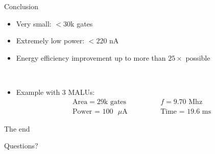 \documentclass[svgnames]{beamer}
\begin{document}
\begin{frame}{Conclusion}
	\begin{itemize}
		\item Very small: $< 30$k gates
		\item Extremely low power: $<220$ nA
		\item Energy efficiency improvement up to more than $25 \times$ possible
	\end{itemize}
	
	\\[1em]
	
	\begin{center}
	\end{center}
	
	\begin{itemize}
		\item<5-> Example with 3 MALUs:
				\[\begin{aligned}
					&\text{Area} = 29\text{k gates} & \qquad &f = 9.70 \text{ Mhz}\\
					&\text{Power = } 100 \text{ } \mu \text{A} \quad & \qquad &\text{Time = } 19.6 \text{ ms}
				\end{aligned}\]
	\end{itemize}
\end{frame}

\begin{frame}{The end}
	\begin{center}\LARGE Questions?\end{center}
\end{frame}
\end{document}
